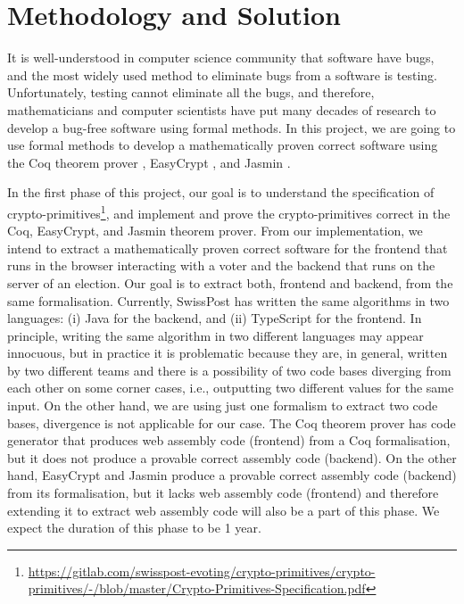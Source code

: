 \documentclass[a4paper]{article}
\begin{document}
\section{Methodology and Solution}
It is well-understood in computer science community that software have bugs, 
and the most widely used method to eliminate bugs from a software is testing. 
Unfortunately, testing cannot eliminate all the bugs, and therefore, 
mathematicians and computer scientists have put many decades of research to develop a bug-free 
software using formal methods. In this project, we are going to use 
formal methods to develop a mathematically proven correct software
using the Coq theorem prover \cite{the_coq_development_team_2019_3476303}, EasyCrypt \cite{10.1007/978-3-642-22792-9_5}, and 
Jasmin \cite{10.1145/3133956.3134078}. 


In the first phase of this project, our goal is to understand the specification of 
crypto-primitives\footnote{\url{https://gitlab.com/swisspost-evoting/crypto-primitives/crypto-primitives/-/blob/master/Crypto-Primitives-Specification.pdf}}, 
and implement  and prove the crypto-primitives correct in the Coq, EasyCrypt, and Jasmin theorem prover. From our implementation, 
we intend to extract a mathematically proven correct software for the frontend 
that runs in the browser interacting with a voter and the backend that runs on the server of an election. 
Our goal is to extract both, frontend and backend, from the same formalisation. Currently, 
SwissPost has written the same algorithms in two languages: (i) Java for the backend, and 
(ii) TypeScript for the frontend.  In principle, writing the same algorithm in 
two different languages may appear innocuous, but in 
practice it is problematic because they are, in general, written by two 
different teams and there is a possibility of two code bases diverging from each other on some corner cases, 
i.e., outputting two different values for the same input. On the other hand, 
we are using just one formalism to extract two code bases, divergence is 
not applicable for our case. 
The Coq theorem prover has code generator that produces web assembly code (frontend) from 
a Coq formalisation, but it does not produce a provable correct assembly code (backend). 
On the other hand, EasyCrypt and Jasmin  produce a provable correct assembly code (backend) from 
its formalisation, but it lacks web assembly code (frontend) and
therefore extending it to extract web assembly code will also be a part of this phase.  
We expect the duration of this phase to be 1 year. 
\end{document}
